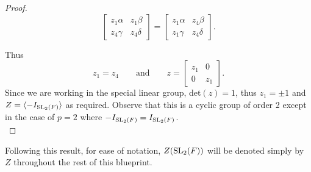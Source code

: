 \begin{proof}
\begin{equation*} \begin{bmatrix} z_1 \alpha & z_1 \beta \\ z_4 \gamma & z_4 \delta \end{bmatrix} = \begin{bmatrix} z_1 \alpha & z_4 \beta \\ z_1 \gamma & z_4 \delta \end{bmatrix}. \end{equation*}

Thus 
\begin{equation*} 
    z_1 = z_4 \qquad  \text{and} \qquad z =  
    \begin{bmatrix} z_1 & 0 \\ 0 & z_1 \end{bmatrix}. 
\end{equation*}
Since we are working in the special linear group, det$(z)=1$, thus $z_1 = \pm 1$ and $Z = \langle - I_{\operatorname{SL}_2(F)}\rangle$ as required. Observe that this is a cyclic group of order 2 except in the case of $p = 2$ where $- I_{\operatorname{SL}_2(F)} = I_{\operatorname{SL}_2(F)}$. \\
\end{proof}


Following this result, for ease of notation, $Z(\operatorname{SL}_2(F))$ will be denoted simply by $Z$ throughout the rest of this blueprint.

